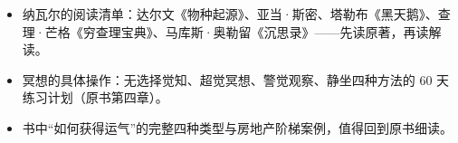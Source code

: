 \documentclass[UTF8,a4paper,11pt]{ctexart}
\begin{document}
\begin{calcbox}
\begin{itemize}
  \item 纳瓦尔的阅读清单：达尔文《物种起源》、亚当·斯密、塔勒布《黑天鹅》、查理·芒格《穷查理宝典》、马库斯·奥勒留《沉思录》——先读原著，再读解读。
  \item 冥想的具体操作：无选择觉知、超觉冥想、警觉观察、静坐四种方法的 60 天练习计划（原书第四章）。
  \item 书中“如何获得运气”的完整四种类型与房地产阶梯案例，值得回到原书细读。
\end{itemize}
\end{calcbox}
\end{document}
